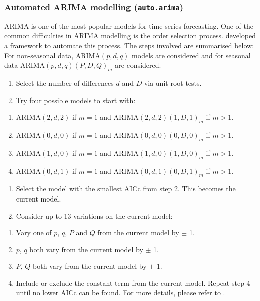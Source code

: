 \documentclass{monashthesis}
\begin{document}
\hypertarget{automated-arima-modelling-auto.arima}{%
\subsubsection{\texorpdfstring{Automated ARIMA modelling (\texttt{auto.arima})}{Automated ARIMA modelling (auto.arima)}}\label{automated-arima-modelling-auto.arima}}

ARIMA is one of the most popular models for time series forecasting. One of the common difficulties in ARIMA modelling is the order selection process. \textcite{Hyndman2008} developed a framework to automate this process. The steps involved are summarised below:
For non-seasonal data, ARIMA\((p, d, q)\) models are considered and for seasonal data ARIMA\((p, d, q)(P, D, Q)_m\) are considered.

\begin{enumerate}
\def\labelenumi{\arabic{enumi}.}
\item
  Select the number of differences \(d\) and \(D\) via unit root tests.
\item
  Try four possible models to start with:
\end{enumerate}

\begin{enumerate}
\def\labelenumi{\roman{enumi})}
\tightlist
\item
  ARIMA\((2, d, 2)\) if \(m=1\) and ARIMA\((2, d, 2)(1, D, 1)_m\) if \(m > 1\).
\item
  ARIMA\((0, d, 0)\) if \(m=1\) and ARIMA\((0, d, 0)(0, D, 0)_m\) if \(m > 1\).
\item
  ARIMA\((1, d, 0)\) if \(m=1\) and ARIMA\((1, d, 0)(1, D, 0)_m\) if \(m > 1\).
\item
  ARIMA\((0, d, 1)\) if \(m=1\) and ARIMA\((0, d, 1)(0, D, 1)_m\) if \(m > 1\).
\end{enumerate}

\begin{enumerate}
\def\labelenumi{\arabic{enumi}.}
\setcounter{enumi}{2}
\item
  Select the model with the smallest AICc from step 2. This becomes the current model.
\item
  Consider up to 13 variations on the current model:
\end{enumerate}

\begin{enumerate}
\def\labelenumi{\roman{enumi})}
\tightlist
\item
  Vary one of \(p\), \(q\), \(P\) and \(Q\) from the current model by \(\pm\) 1.
\item
  \(p\), \(q\) both vary from the current model by \(\pm\) 1.
\item
  \(P\), \(Q\) both vary from the current model by \(\pm\) 1.
\item
  Include or exclude the constant term from the current model.
  Repeat step 4 until no lower AICc can be found. For more details, please refer to \textcite{Hyndman2008}.
\end{enumerate}
\end{document}
